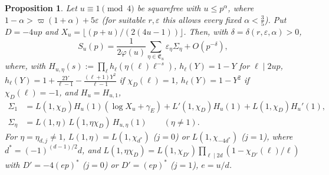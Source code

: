 \documentclass[11pt,reqno]{amsart}
\newtheorem{proposition}[theorem]{Proposition}
\theoremstyle{definition}
\newcommand{\eps}{\varepsilon}
\newcommand{\cE}{\mathfrak E}
\begin{document}
\begin{proposition}\label{prop:C}
Let $u\equiv1\pmod4$ be squarefree with $u\le p^{\alpha}$, where
$1-\alpha>\varpi(1+\alpha)+5\eps$ (for suitable $r,\eps$ this allows every
fixed $\alpha<\frac35$).  Put $D=-4up$ and $X_u=\lfloor
(p+u)/(2(4u-1))\rfloor$.  Then, with $\delta=\delta(r,\eps,\alpha)>0$,
\[
 S_u(p)=\frac1{2\varphi(u)}\sum_{\eta\in\cE_u}\eps_\eta\Sigma_\eta+O(p^{-\delta}),
\]
where, with $H_{u,\eta}(s):=\prod_\ell h_\ell(\eta(\ell)\ell^{-s})$,
$h_\ell(Y)=1-Y$ for $\ell\mid2up$, $h_\ell(Y)=1+\frac{2Y}{\ell-1}-\frac{(\ell+1)Y^2}{\ell-1}$
if $\chi_D(\ell)=1$, $h_\ell(Y)=1-Y^2$ if $\chi_D(\ell)=-1$, and $H_u=H_{u,1}$,
\begin{align*}
 \Sigma_1&=L(1,\chi_D)H_u(1)(\log X_u+\gamma_E)+L'(1,\chi_D)H_u(1)+L(1,\chi_D)H_u'(1),\\
 \Sigma_\eta&=L(1,\eta)\,L(1,\eta\chi_D)\,H_{u,\eta}(1)\qquad(\eta\ne1).
\end{align*}
For $\eta=\eta_{d,j}\ne1$, $L(1,\eta)=L(1,\chi_{d^*})$ ($j=0$) or
$L(1,\chi_{-4d^*})$ ($j=1$), where $d^*=(-1)^{(d-1)/2}d$, and
$L(1,\eta\chi_D)=L(1,\chi_{D'})\prod_{\ell\mid2d}(1-\chi_{D'}(\ell)/\ell)$ with
$D'=-4(ep)^*$ ($j=0$) or $D'=(ep)^*$ ($j=1$), $e=u/d$.
\end{proposition}
\end{document}
